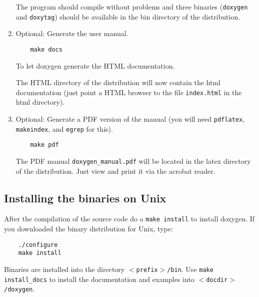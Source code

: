 \begin{enumerate}
The program should compile without problems and three binaries ({\tt doxygen} and {\tt doxytag}) should be available in the bin directory of the distribution.

\item Optional: Generate the user manual.



\footnotesize\begin{verbatim}
    make docs
\end{verbatim}
\normalsize


To let doxygen generate the HTML documentation.

The HTML directory of the distribution will now contain the html documentation (just point a HTML browser to the file {\tt index.html} in the html directory).

\item Optional: Generate a PDF version of the manual (you will need {\tt pdflatex}, {\tt makeindex}, and {\tt egrep} for this).



\footnotesize\begin{verbatim}
    make pdf
\end{verbatim}
\normalsize


The PDF manual {\tt doxygen\_\-manual.pdf} will be located in the latex directory of the distribution. Just view and print it via the acrobat reader.

\end{enumerate}
\subsection{Installing the binaries on Unix}\label{install_install_bin_unix}
After the compilation of the source code do a {\tt make install} to install doxygen. If you downloaded the binary distribution for Unix, type:



\footnotesize\begin{verbatim}
    ./configure
    make install
\end{verbatim}
\normalsize


Binaries are installed into the directory {\tt $<$prefix$>$/bin}. Use {\tt make install\_\-docs} to install the documentation and examples into {\tt $<$docdir$>$/doxygen}.

